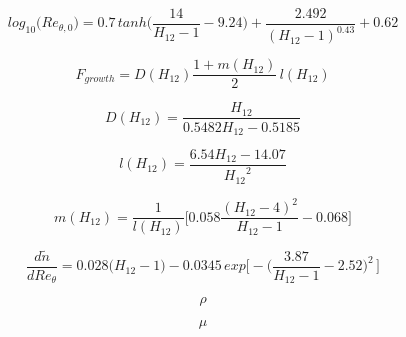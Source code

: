 {\newpage\clearpage
{}%
\begin{displaymath}
{log}_{10} \Big(Re_{\theta ,0} \Big) = 0.7 \, {tanh} \bigg(\frac{14}{H_{12} - 1} - 9.24 \bigg) + \frac{2.492}{(H_{12} - 1)^{0.43}} + 0.62
\end{displaymath}%
\lthtmldisplayZ
\lthtmlcheckvsize\clearpage}

{\newpage\clearpage
{}%
\begin{displaymath}
F_{growth} = D (H_{12}) \frac{1 + m(H_{12})}{2} \, l({H_{12}})
\end{displaymath}%
\lthtmldisplayZ
\lthtmlcheckvsize\clearpage}

{\newpage\clearpage
{}%
\begin{displaymath}
D(H_{12}) = \frac{H_{12}}{0.5482 H_{12} - 0.5185}
\end{displaymath}%
\lthtmldisplayZ
\lthtmlcheckvsize\clearpage}

{\newpage\clearpage
{}%
\begin{displaymath}
l(H_{12}) = \frac{6.54 H_{12} - 14.07}{{H_{12}}^2}
\end{displaymath}%
\lthtmldisplayZ
\lthtmlcheckvsize\clearpage}

{\newpage\clearpage
{}%
\begin{displaymath}
m(H_{12}) = \frac{1}{l(H_{12})} \bigg[0.058 \frac{(H_{12} - 4)^2}{H_{12} - 1} - 0.068 \bigg]
\end{displaymath}%
\lthtmldisplayZ
\lthtmlcheckvsize\clearpage}

{\newpage\clearpage
{}%
\begin{displaymath}
\frac{d \tilde{n}}{d Re_{\theta}} = 0.028 \Big( H_{12} - 1 \Big) - 0.0345 \, {exp} \bigg[- \bigg(\frac{3.87}{H_{12}-1} - 2.52 \bigg)^2 \, \bigg]
\end{displaymath}%
\lthtmldisplayZ
\lthtmlcheckvsize\clearpage}

{\newpage\clearpage
{}%
\begin{displaymath}
\rho
\end{displaymath}%
\lthtmldisplayZ
\lthtmlcheckvsize\clearpage}

{\newpage\clearpage
{}%
\begin{displaymath}
\mu
\end{displaymath}%
\lthtmldisplayZ
\lthtmlcheckvsize\clearpage}

